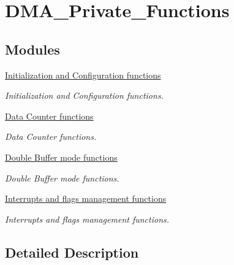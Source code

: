\hypertarget{group___d_m_a___private___functions}{\section{D\-M\-A\-\_\-\-Private\-\_\-\-Functions}
\label{group___d_m_a___private___functions}
}
\subsection*{Modules}
\begin{DoxyCompactItemize}
\item 
\hyperlink{group___d_m_a___group1}{Initialization and Configuration functions}
\begin{DoxyCompactList}\small\item\em Initialization and Configuration functions. \end{DoxyCompactList}\item 
\hyperlink{group___d_m_a___group2}{Data Counter functions}
\begin{DoxyCompactList}\small\item\em Data Counter functions. \end{DoxyCompactList}\item 
\hyperlink{group___d_m_a___group3}{Double Buffer mode functions}
\begin{DoxyCompactList}\small\item\em Double Buffer mode functions. \end{DoxyCompactList}\item 
\hyperlink{group___d_m_a___group4}{Interrupts and flags management functions}
\begin{DoxyCompactList}\small\item\em Interrupts and flags management functions. \end{DoxyCompactList}\end{DoxyCompactItemize}


\subsection{Detailed Description}

